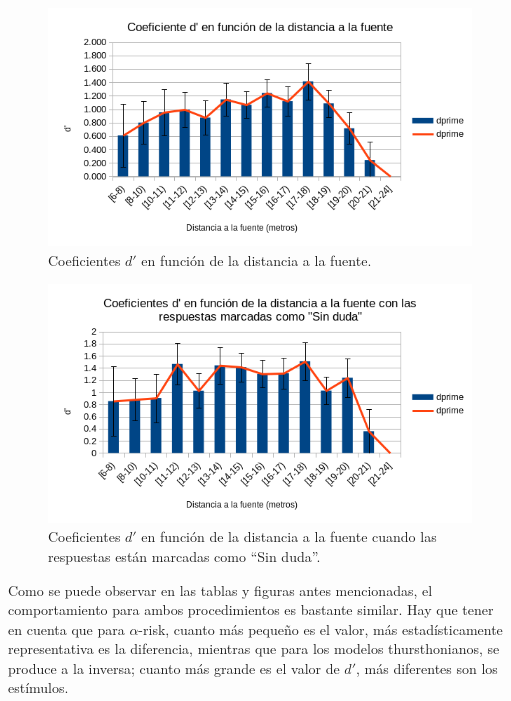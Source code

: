 \documentclass[11pt,a4paper,twoside]{book}
\begin{document}
		    \begin{figure}[H]
                \includegraphics[scale=0.7]{../imagenes/analisisThurstFuenteDuda.png}
			    \centering
			    \caption{Coeficientes $d'$ en función de la distancia a la fuente.} 
			    \label{fig:ThurstFuenteDuda}
            \end{figure}
            
            \begin{figure}[H]
                \includegraphics[scale=0.7]{../imagenes/analisisThurstFuenteSinDuda.png}
			    \centering
			    \caption{Coeficientes $d'$ en función de la distancia a la fuente cuando las respuestas están marcadas como ``Sin duda''.} 
			    \label{fig:ThurstFuenteSinDuda}
            \end{figure}

            Como se puede observar en las tablas y figuras antes mencionadas, el comportamiento para ambos procedimientos es bastante similar. Hay que tener en cuenta que para $\alpha$-risk, cuanto más pequeño es el valor, más estadísticamente representativa es la diferencia, mientras que para los modelos thursthonianos, se produce a la inversa; cuanto más grande es el valor de $d'$, más diferentes son los estímulos.
            
\end{document}

